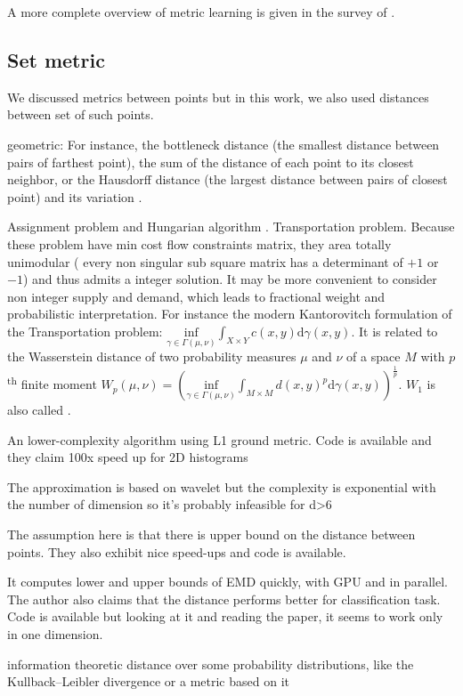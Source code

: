 A more complete overview of metric learning is given in the survey of \textcite{MetricSurvey13}.

\subsection{Set metric}
We discussed metrics between points but in this work, we also used distances between set of such points.

geometric: For instance, the bottleneck distance \autocite{Bottleneck96} (the smallest distance between pairs of farthest point), the sum of the distance of each point to its closest neighbor, or the Hausdorff distance (the largest distance between pairs of closest point) and its variation \autocite{ModifiedHausdorff94}.

Assignment problem and Hungarian algorithm \autocite{Hungarian57}. Transportation problem. Because these problem have min cost flow constraints matrix, they area totally unimodular (\ie{} every non singular sub square matrix has a determinant of $+1$ or $-1$) and thus admits a integer solution.
It may be more convenient to consider non integer supply and demand, which leads to fractional weight and probabilistic interpretation. For instance the modern Kantorovitch formulation of the Transportation problem: $\underset{\gamma \in \Gamma(\mu, \nu)}{\mathrm{inf}} \int_{X\times Y} c(x,y)\mathrm{d}\gamma(x,y)$. It is related to the Wasserstein distance of two probability measures $\mu$ and $\nu$ of a space $M$ with $p$\textsuperscript{th} finite moment
$W_p(\mu, \nu) = \left( \underset{\gamma \in \Gamma(\mu, \nu)}{\mathrm{inf}} \int_{M\times M} d(x,y)^p\mathrm{d}\gamma(x,y)\right)^{\frac{1}{p}}$. $W_1$ is also called  \autocite{EMD98}.


An lower-complexity algorithm using L1 ground metric. Code is available and they claim 100x speed up for 2D histograms \autocite{Ling2007}

The approximation is based on wavelet but the complexity is exponential with the number of dimension so it's probably infeasible for d>6 \autocite{Shirdhonkar2008}

The assumption here is that there is upper bound on the distance between points. They also exhibit nice speed-ups and code is available. \autocite{Pele2009}

It computes lower and upper bounds of EMD quickly, with GPU and in parallel. The author also claims that the distance performs better for classification task. Code is available but looking at it and reading the paper, it seems to work only in one dimension. \autocite{FastEMD13}


information theoretic distance over some probability distributions, like the Kullback--Leibler divergence or a metric based on it  \autocite{JensenShannon03}
